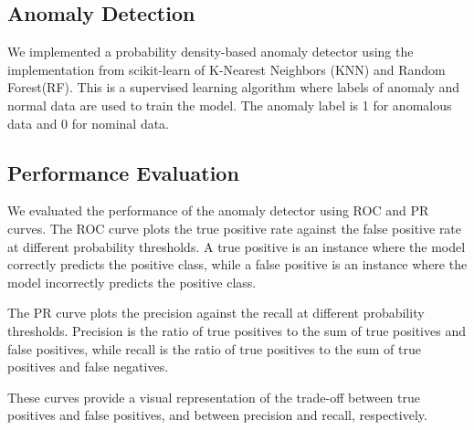 \subsection{Anomaly Detection}
We implemented a probability density-based anomaly detector using the implementation from scikit-learn of K-Nearest Neighbors (KNN) and Random Forest(RF). 
This is a supervised learning algorithm where labels of anomaly and normal data are used to train the model.
The anomaly label is 1 for anomalous data and 0 for nominal data.\par

\subsection{Performance Evaluation}
We evaluated the performance of the anomaly detector using ROC and PR curves. 
The ROC curve plots the true positive rate against the false positive rate at different probability thresholds.
A true positive is an instance where the model correctly predicts the positive class, while a false positive is an instance where the model incorrectly predicts the positive class.\par
The PR curve plots the precision against the recall at different probability thresholds. 
Precision is the ratio of true positives to the sum of true positives and false positives, while recall is the ratio of true positives to the sum of true positives and false negatives.\cite{precision_recall_wiki}\par
These curves provide a visual representation of the trade-off between true positives and false positives, and between precision and recall, respectively.\par








